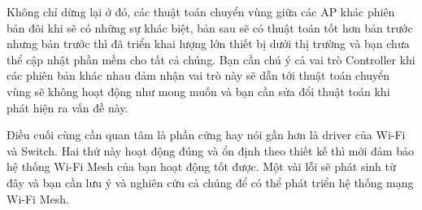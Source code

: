 Không chỉ dừng lại ở đó, các thuật toán chuyển vùng giữa các AP khác phiên bản đôi khi sẽ có những sự khác biệt, bản sau sẽ có thuật toán tốt hơn bản trước nhưng bản trước thì đã triển khai lượng lớn thiết bị dưới thị trường và bạn chưa thể cập nhật phần mềm cho tất cả chúng. Bạn cần chú ý cả vai trò Controller khi các phiên bản khác nhau đảm nhận vai trò này sẽ dẫn tới thuật toán chuyển vùng sẽ không hoạt động như mong muốn và bạn cần sửa đổi thuật toán khi phát hiện ra vấn đề này.

Điều cuối cùng cần quan tâm là phần cứng hay nói gần hơn là driver của Wi-Fi và Switch. Hai thứ này hoạt động đúng và ổn định theo thiết kế thì mới đảm bảo hệ thống Wi-Fi Mesh của bạn hoạt động tốt được. Một vài lỗi sẽ phát sinh từ đây và bạn cần lưu ý và nghiên cứu cả chúng để có thể phát triển hệ thống mạng Wi-Fi Mesh.